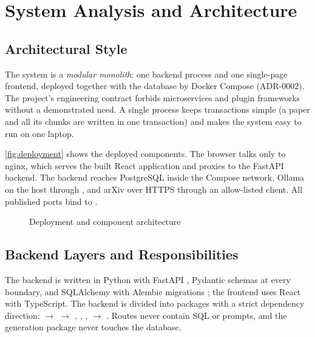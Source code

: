 \chapter{System Analysis and Architecture}\label{ch:architecture}

\section{Architectural Style}

The system is a \emph{modular monolith}: one backend process and one single-page frontend, deployed together with
the database by Docker Compose (ADR-0002). The project's engineering contract forbids microservices and plugin
frameworks without a demonstrated need. A single process keeps transactions simple (a paper and all its chunks are
written in one transaction) and makes the system easy to run on one laptop.

\autoref{fig:deployment} shows the deployed components. The browser talks only to nginx, which serves the built
React application and proxies  to the FastAPI backend. The backend reaches PostgreSQL inside the
Compose network, Ollama on the host through , and arXiv over HTTPS through an
allow-listed client. All published ports bind to .

\begin{figure}[htbp]
  \centering
  \caption{Deployment and component architecture}\label{fig:deployment}
\end{figure}

\section{Backend Layers and Responsibilities}

The backend is written in Python with FastAPI \cite{fastapi}, Pydantic schemas at every boundary, and SQLAlchemy
with Alembic migrations \cite{sqlalchemy}; the frontend uses React \cite{react} with TypeScript.
The backend is divided into packages with a strict dependency direction:  $\rightarrow$
 $\rightarrow$ , , , 
$\rightarrow$ . Routes never contain SQL or prompts, and the generation package never touches the
database.

